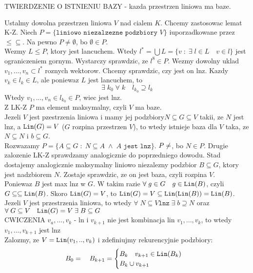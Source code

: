 \documentclass{article}
\begin{document}
    \begin{center}\large
        \color{def}TWIERDZENIE O ISTNIENIU BAZY \color{txt}- kazda przestrzen liniowa ma baze.
    \end{center}
    Ustalmy dowolna przestrzen liniowa $V$ nad cialem $K$. Chcemy zastosowac lemat K-Z. Niech $P=\{\texttt{liniowo niezalzezne podzbiory }V\}$ iuporzadkowane przez $\leq\subseteq$. Na pewno $P\neq\emptyset$, bo $\emptyset\in P$.\smallskip\\
    Wezmy $L\leq P$, ktory jest lancuchem. Wtedy $l^*=\bigcup L=\{v\;:\;\exists\;l\in L\quad v\in l\}$ jest ograniczeniem gornym. Wystarczy sprawdzic, ze $l^8\in P$. Wezmy dowolny uklad $v_1, ..., v_n\subset l^*$ roznych wektorow. Chcemy sprawdzic, czy jest on lnz. Kazdy $v_k\in l_k\in L$, ale poniewaz $L$ jest lancuchem, to
    $$\exists\;k_0\;\forall\;k\quad l_{k_0} \supseteq l_k$$
    Wtedy $v_1, ..., v_n\in l_{k_0}\in P$, wiec jest lnz.\smallskip\\
    Z LK-Z $P$ ma element maksymalny, czyli $V$ ma baze.\bigskip\\
    Jezeli $V$ jest pzestrzenia liniowa i mamy jej podzbiory$N\subseteq G\subseteq V$ takii, ze $N$ jest lnz, a $\texttt{Lin}(G)=V$ ($G$ rozpina przestrzen $V$), to wtedy istnieje baza dla $V$ taka, ze $N\subseteq N$ i $b\subseteq G$.\medskip\\
    Rozwazamy $P=\{A\subseteq G\;:\;N\subseteq A\;\land\;A\texttt{ jest lnz}\}$. $P\neq\empty$, bo $N\in P$. Drugie zalozenie LK-Z sprawdzamy analogicznie do poprzedniego dowodu. Stad dostajemy analogicznie maksymalny liniowo niezalezny podzbior $B\subseteq G$, ktory jest nadzbiorem $N$. Zostaje sprawdzic, ze on jest baza, czyli rozpina $V$.\smallskip\\
    Poniewaz $B$ jest max lnz w $G$. W takim razie $\forall\;g\in G\quad g\in\texttt{Lin}(B)$, czyli $G\subseteq\subseteq\texttt{Lin}(B)$. Skoro $\texttt{Lin}(G)=V$, to $\texttt{Lin}(G)=V\subseteq\texttt{Lin}(\texttt{Lin}(B))=\texttt{Lin}(B)$.\bigskip\\
    Jezeli $V$ jest przestrzenia liniowa, to wtedy $\forall\;N\subseteq V \texttt{lnz}\;\exists\; b\supseteq N$ oraz $\forall\;G\subseteq V\quad\texttt{Lin}(G)=V\;\exists\;B\subseteq G$\bigskip\\
    \color{tit}CWICZENIA \color{txt}$v_a, ..., v_k$ - ln i $v_{k+1}$ nie jest kombinacja lin $v_1, ..., v_k$, to wtedy $v_1, ..., v_{k+1}$ jest lnz\medskip\\
    Zalozmy, ze $V=\texttt{Lin}(v_1, .., v_k)$ i zdefiniujmy rekurencyjnie podzbiory:
    $$B_0=\empty\quad B_{k+1}=\begin{cases}B_k\quad v_{k+1}\in\Lin{B_k}\\B_k\cup v_{k+1}\end{cases}$$
\end{document}

